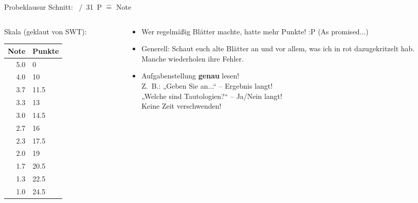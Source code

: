 \begin{frame}{Probeklausur}
	Schnitt: \quad {}~/~31~P \quad $\hat{=}$ Note  \\
	\begin{columns}[T] 
		\hspace{.5\baselineskip}
		\begin{column}[T]{.30\textwidth} 
			Skala {\small (geklaut von SWT)}: \\
			\begin{tabular}{|r|l|}
				\hline
				Note & Punkte \\
				\hline
				5.0	& 0 	\\ \hline
				4.0 & 10	\\ \hline
				3.7 & 11.5	\\ \hline
				3.3	& 13	\\ \hline
				3.0	& 14.5	\\ \hline
				2.7	& 16	\\ \hline
				2.3	& 17.5	\\ \hline
				2.0	& 19	\\ \hline
				1.7	& 20.5	\\ \hline
				1.3	& 22.5	\\ \hline
				1.0	& 24.5	\\ \hline
			\end{tabular}
		\end{column}
		\hspace{-\baselineskip}
		\begin{column}[T]{.68\textwidth} 
			\begin{itemize}
				\item Wer regelmäßig Blätter machte, hatte mehr Punkte! :P {\small (As promised...)}
				\item Generell: Schaut euch alte Blätter an und vor allem, \alert{was ich in rot dazugekritzelt} hab. \\
				\impl Manche wiederholen ihre Fehler.
				\item Aufgabenstellung \textbf{genau} lesen! \\
				Z.~B.: „Geben Sie an...“ – Ergebnis langt! \\ „Welche sind Tautologien?“ – Ja/Nein langt! \\ \impl Keine Zeit verschwenden! 
				
			\end{itemize}
		\end{column}
	\end{columns}
	
\end{frame}

